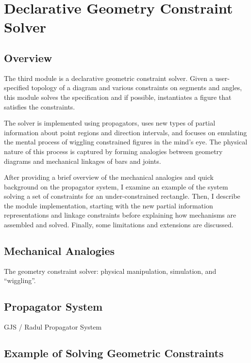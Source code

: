 \chapter{Declarative Geometry Constraint Solver}
\label{chap:declarative}

\section{Overview}

The third module is a declarative geometric constraint solver. Given a
user-specified topology of a diagram and various constraints on
segments and angles, this module solves the specification and if
possible, instantiates a figure that satisfies the constraints.

The solver is implemented using propagators, uses new types of partial
information about point regions and direction intervals, and focuses
on emulating the mental process of wiggling constrained figures in the
mind's eye. The physical nature of this process is captured by forming
analogies between geometry diagrams and mechanical linkages of bars
and joints.

After providing a brief overview of the mechanical analogies and quick
background on the propagator system, I examine an example of the
system solving a set of constraints for an under-constrained
rectangle. Then, I describe the module implementation, starting with
the new partial information representations and linkage constraints
before explaining how mechanisms are assembled and solved. Finally,
some limitations and extensions are discussed.


\section{Mechanical Analogies}

The geometry constraint solver: physical manipulation, simulation,
and ``wiggling''.

\section{Propagator System}

GJS / Radul Propagator System

\section{Example of Solving Geometric Constraints}

